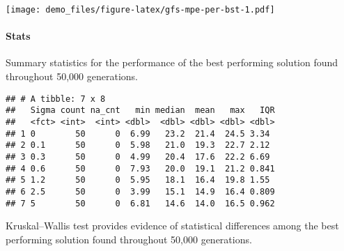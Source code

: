\documentclass[]{book}
\newenvironment{Shaded}{\begin{snugshade}}{\end{snugshade}}
\newcommand{\DataTypeTok}[1]{\textcolor[rgb]{0.13,0.29,0.53}{#1}}
\newcommand{\KeywordTok}[1]{\textcolor[rgb]{0.13,0.29,0.53}{\textbf{#1}}}
\newcommand{\NormalTok}[1]{#1}
\newcommand{\OperatorTok}[1]{\textcolor[rgb]{0.81,0.36,0.00}{\textbf{#1}}}
\newcommand{\OtherTok}[1]{\textcolor[rgb]{0.56,0.35,0.01}{#1}}
\newcommand{\StringTok}[1]{\textcolor[rgb]{0.31,0.60,0.02}{#1}}
\let\oldparagraph\paragraph
\renewcommand{\paragraph}[1]{\oldparagraph{#1}\mbox{}}
\begin{document}
\texttt{[image: demo\_files/figure-latex/gfs-mpe-per-bst-1.pdf]}

\hypertarget{stats-46}{%
\paragraph{Stats}\label{stats-46}}

Summary statistics for the performance of the best performing solution found throughout 50,000 generations.

\begin{Shaded}
\end{Shaded}

\begin{verbatim}
## # A tibble: 7 x 8
##   Sigma count na_cnt   min median  mean   max   IQR
##   <fct> <int>  <int> <dbl>  <dbl> <dbl> <dbl> <dbl>
## 1 0        50      0  6.99   23.2  21.4  24.5 3.34 
## 2 0.1      50      0  5.98   21.0  19.3  22.7 2.12 
## 3 0.3      50      0  4.99   20.4  17.6  22.2 6.69 
## 4 0.6      50      0  7.93   20.0  19.1  21.2 0.841
## 5 1.2      50      0  5.95   18.1  16.4  19.8 1.55 
## 6 2.5      50      0  3.99   15.1  14.9  16.4 0.809
## 7 5        50      0  6.81   14.6  14.0  16.5 0.962
\end{verbatim}

Kruskal--Wallis test provides evidence of statistical differences among the best performing solution found throughout 50,000 generations.
\end{document}
